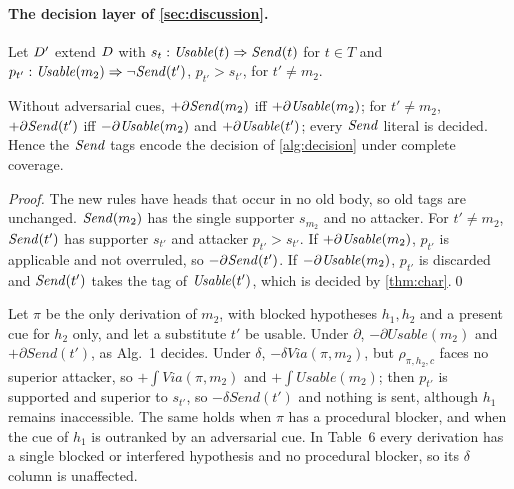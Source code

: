 \paragraph{The decision layer of \cref{sec:discussion}.}
Let $D'$ extend $D$ with $s_t:\mathit{Usable}(t)\Rightarrow\mathit{Send}(t)$ for $t\in T$ and $p_{t'}:\mathit{Usable}(m_2)\Rightarrow\neg\mathit{Send}(t')$, $p_{t'}>s_{t'}$, for $t'\neq m_2$.

\begin{proposition}\label{prop:layer}
Without adversarial cues, $+\partial\mathit{Send}(m_2)$ iff $+\partial\mathit{Usable}(m_2)$; for $t'\neq m_2$, $+\partial\mathit{Send}(t')$ iff $-\partial\mathit{Usable}(m_2)$ and $+\partial\mathit{Usable}(t')$; every $\mathit{Send}$ literal is decided. Hence the $\mathit{Send}$ tags encode the decision of \cref{alg:decision} under complete coverage.
\end{proposition}
\begin{proof}
The new rules have heads that occur in no old body, so old tags are unchanged. $\mathit{Send}(m_2)$ has the single supporter $s_{m_2}$ and no attacker. For $t'\neq m_2$, $\mathit{Send}(t')$ has supporter $s_{t'}$ and attacker $p_{t'}>s_{t'}$. If $+\partial\mathit{Usable}(m_2)$, $p_{t'}$ is applicable and not overruled, so $-\partial\mathit{Send}(t')$. If $-\partial\mathit{Usable}(m_2)$, $p_{t'}$ is discarded and $\mathit{Send}(t')$ takes the tag of $\mathit{Usable}(t')$, which is decided by \cref{thm:char}.\qed
\end{proof}

\begin{remark}
Let $\pi$ be the only derivation of $m_2$, with blocked hypotheses $h_1,h_2$ and a present cue for $h_2$ only, and let a substitute $t'$ be usable. Under $\partial$, $-\partial\mathit{Usable}(m_2)$ and $+\partial\mathit{Send}(t')$, as Alg.~1 decides. Under $\delta$, $-\delta\mathit{Via}(\pi,m_2)$, but $\rho_{\pi,h_2,c}$ faces no superior attacker, so $+\!\int\mathit{Via}(\pi,m_2)$ and $+\!\int\mathit{Usable}(m_2)$; then $p_{t'}$ is supported and superior to $s_{t'}$, so $-\delta\mathit{Send}(t')$ and nothing is sent, although $h_1$ remains inaccessible. The same holds when $\pi$ has a procedural blocker, and when the cue of $h_1$ is outranked by an adversarial cue. In Table~6 every derivation has a single blocked or interfered hypothesis and no procedural blocker, so its $\delta$ column is unaffected.
\end{remark}

